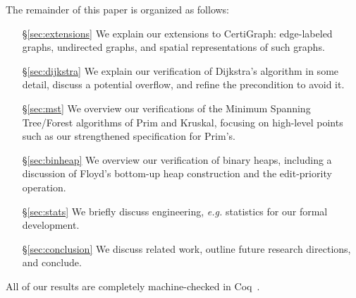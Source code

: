 The remainder of this paper is organized as follows:
\begin{itemize}
    \item[\S\ref{sec:extensions}] We explain our extensions to CertiGraph: edge-labeled graphs, undirected graphs, and spatial representations of such graphs.
    \item[\S\ref{sec:dijkstra}] We explain our verification of Dijkstra's algorithm in some detail, discuss a potential overflow, and refine the precondition to avoid it. %
    \item[\S\ref{sec:mst}] We overview our verifications of the Minimum Spanning Tree/Forest algorithms of Prim and Kruskal, focusing on high-level points such as our strengthened specification for Prim's.
    \item[\S\ref{sec:binheap}] We overview our verification of binary heaps, including a discussion of Floyd's bottom-up heap construction and the edit-priority operation.
    \item[\S\ref{sec:stats}] We briefly discuss engineering, \emph{e.g.} statistics for our formal development.
    \item[\S\ref{sec:conclusion}] We discuss related work, outline future research directions, and conclude.
\end{itemize}

\noindent All of our results are completely machine-checked in Coq~\cite{CITE}.%
